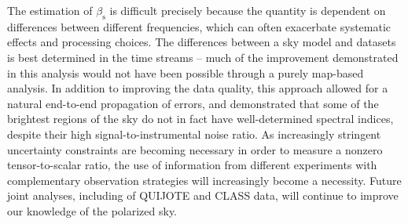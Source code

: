 \documentclass[twocolumn]{../../common/aa}
\begin{document}
The estimation of $\beta_\mathrm s$ is difficult precisely because the quantity is dependent on differences between different frequencies, which can often exacerbate systematic effects and processing choices. The differences between a sky model and datasets is best determined in the time streams -- much of the improvement demonstrated in this analysis would not have been possible through a purely map-based analysis. In addition to improving the data quality, this approach allowed for a natural end-to-end propagation of errors, and demonstrated that some of the brightest regions of the sky  do not in fact have well-determined spectral indices, despite their high signal-to-instrumental noise ratio. As increasingly stringent uncertainty constraints are becoming necessary in order to measure a nonzero tensor-to-scalar ratio, the use of information from different experiments with complementary observation strategies will increasingly become a necessity. Future joint analyses, including of QUIJOTE and CLASS data, will continue to improve our knowledge of the polarized sky.







\end{document}
